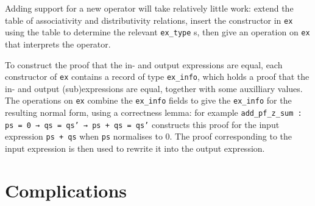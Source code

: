 \documentclass{llncs}
\newcommand{\lean}[1]{\texttt{#1}\xspace} %
\newcommand{\ex}{\lean{ex}}
\newcommand{\ringexp}{\lean{ring\_exp}}
\begin{document}

Adding support for a new operator will take relatively little work:
extend the table of associativity and distributivity relations,
insert the constructor in \ex using the table to determine the relevant \lean{ex\_type}s,
then give an operation on \ex that interprets the operator.

To construct the proof that the in- and output expressions are equal, each constructor of \ex contains a record of type \lean{ex\_info},
which holds a proof that the in- and output (sub)expressions are equal, together with some auxilliary values.
The operations on \ex combine the \lean{ex\_info} fields to give the \lean{ex\_info} for the resulting normal form,
using a correctness lemma: for example \lean{add\_pf\_z\_sum : ps = 0 → qs = qs' → ps + qs = qs'} constructs this proof for the input expression \lean{ps + qs} when \lean{ps} normalises to $0$.
The proof corresponding to the input expression is then used to rewrite it into the output expression.


\section{Complications}
\end{document}
